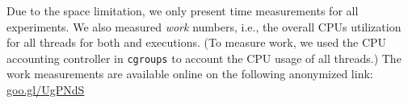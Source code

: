  Due to the space limitation, we only present  time measurements for all experiments. We also measured  {\em work} numbers, i.e., the overall CPUs utilization for all threads for both \pthreads and \projecttitle executions. (To measure work, we used the CPU accounting controller in {\tt cgroups} to account the CPU usage of all threads.) The work measurements are available online on the following anonymized link:  \href{goo.gl/UgPNdS}{goo.gl/UgPNdS}







%
%
%
%
%

